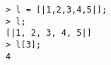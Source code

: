 \begin{center}\begin{minipage}{15cm}\begin{Verbatim}[frame=single]
> l = [|1,2,3,4,5|];
> l;
[|1, 2, 3, 4, 5|]
> l[3];
4
\end{Verbatim}
\end{minipage}\end{center}
